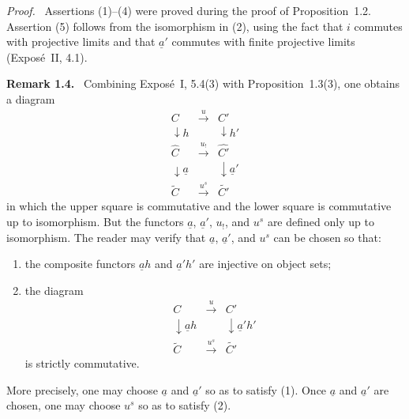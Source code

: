 \documentclass[11pt]{article}
\newenvironment{remarktext}[1]{\par\medskip\noindent\textbf{#1.}\ }{\par\medskip}
\newenvironment{prooftext}{\par\noindent\emph{Proof.}\ }{\par\medskip}
\begin{document}
\begin{prooftext}
Assertions (1)--(4) were proved during the proof of Proposition~1.2. Assertion (5) follows from the isomorphism in (2), using the fact that \(i\) commutes with projective limits and that \(\underline a'\) commutes with finite projective limits (Expos\'e~II, 4.1).
\end{prooftext}

\begin{remarktext}{Remark 1.4}
Combining Expos\'e~I, 5.4(3) with Proposition~1.3(3), one obtains a diagram
\[
\begin{array}{ccc}
C&\xrightarrow{u}&C'\\
\downarrow h&&\downarrow h'\\
\widehat C&\xrightarrow{u_!}&\widehat{C'}\\
\downarrow\underline a&&\downarrow\underline a'\\
\widetilde C&\xrightarrow{u^s}&\widetilde{C'}
\end{array}
\]
in which the upper square is commutative and the lower square is commutative up to isomorphism. But the functors \(\underline a\), \(\underline a'\), \(u_!\), and \(u^s\) are defined only up to isomorphism. The reader may verify that \(\underline a\), \(\underline a'\), and \(u^s\) can be chosen so that:
\begin{enumerate}[label=\arabic*)]
\item the composite functors \(\underline ah\) and \(\underline a'h'\) are injective on object sets;
\item the diagram
\[
\begin{array}{ccc}
C&\xrightarrow{u}&C'\\
\downarrow\underline ah&&\downarrow\underline a'h'\\
\widetilde C&\xrightarrow{u^s}&\widetilde{C'}
\end{array}
\]
is strictly commutative.
\end{enumerate}
More precisely, one may choose \(\underline a\) and \(\underline a'\) so as to satisfy (1). Once \(\underline a\) and \(\underline a'\) are chosen, one may choose \(u^s\) so as to satisfy (2).
\end{remarktext}
\end{document}
